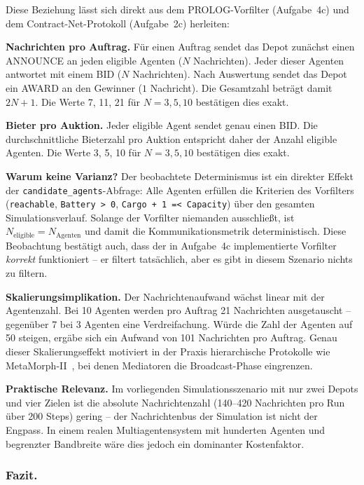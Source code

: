 Diese Beziehung lässt sich direkt aus dem \acs{PROLOG}-Vorfilter (Aufgabe~4c) und dem Contract-Net-Protokoll (Aufgabe~2c) herleiten:

\textbf{Nachrichten pro Auftrag.} Für einen Auftrag sendet das Depot zunächst einen ANNOUNCE an jeden eligible Agenten ($N$ Nachrichten). Jeder dieser Agenten antwortet mit einem BID ($N$ Nachrichten). Nach Auswertung sendet das Depot ein AWARD an den Gewinner ($1$ Nachricht). Die Gesamtzahl beträgt damit $2N + 1$. Die Werte 7, 11, 21 für $N = 3, 5, 10$ bestätigen dies exakt.

\textbf{Bieter pro Auktion.} Jeder eligible Agent sendet genau einen BID. Die durchschnittliche Bieterzahl pro Auktion entspricht daher der Anzahl eligible Agenten. Die Werte 3, 5, 10 für $N = 3, 5, 10$ bestätigen dies exakt.

\textbf{Warum keine Varianz?} Der beobachtete Determinismus ist ein direkter Effekt der \texttt{candidate\_agents}-Abfrage: Alle Agenten erfüllen die Kriterien des Vorfilters (\texttt{reachable}, \texttt{Battery > 0}, \texttt{Cargo + 1 =< Capacity}) über den gesamten Simulationsverlauf. Solange der Vorfilter niemanden ausschließt, ist $N_{\text{eligible}} = N_{\text{Agenten}}$ und damit die Kommunikationsmetrik deterministisch. Diese Beobachtung bestätigt auch, dass der in Aufgabe~4c implementierte Vorfilter \textit{korrekt} funktioniert -- er filtert tatsächlich, aber es gibt in diesem Szenario nichts zu filtern.

\textbf{Skalierungsimplikation.} Der Nachrichtenaufwand wächst linear mit der Agentenzahl. Bei 10 Agenten werden pro Auftrag 21 Nachrichten ausgetauscht -- gegenüber 7 bei 3 Agenten eine Verdreifachung. Würde die Zahl der Agenten auf 50 steigen, ergäbe sich ein Aufwand von 101 Nachrichten pro Auftrag. Genau dieser Skalierungseffekt motiviert in der Praxis hierarchische Protokolle wie MetaMorph-II~\cite[S. 32]{5}, bei denen Mediatoren die Broadcast-Phase eingrenzen.

\textbf{Praktische Relevanz.} Im vorliegenden Simulationsszenario mit nur zwei Depots und vier Zielen ist die absolute Nachrichtenzahl (140--420 Nachrichten pro Run über 200 Steps) gering -- der Nachrichtenbus der Simulation ist nicht der Engpass. In einem realen Multiagentensystem mit hunderten Agenten und begrenzter Bandbreite wäre dies jedoch ein dominanter Kostenfaktor.

\subsubsection{Fazit.}

